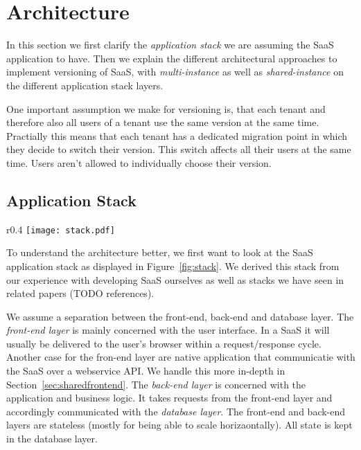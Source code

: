 \section{Architecture}
\label{sec:architecture}

In this section we first clarify the \emph{application stack} we are assuming the SaaS application to have. Then we explain the different architectural approaches to implement versioning of SaaS, with \emph{multi-instance} as well as \emph{shared-instance} on the different application stack layers.

One important assumption we make for versioning is, that each tenant and therefore also all users of a tenant use the same version at the same time. Practially this means that each tenant has a dedicated migration point in which they decide to switch their version. This switch affects all their users at the same time. Users aren't allowed to individually choose their version.

\subsection{Application Stack}

\begin{wrapfigure}{r}{0.4\textwidth}
\centering
\texttt{[image: stack.pdf]}
\caption{Simplified Application Stack}
\label{fig:stack}
\end{wrapfigure}

To understand the architecture better, we first want to look at the SaaS application stack as displayed in Figure~\ref{fig:stack}. We derived this stack from our experience with developing SaaS ourselves as well as stacks we have seen in related papers (TODO references).

We assume a separation between the front-end, back-end and database layer. The \emph{front-end layer} is mainly concerned with the user interface. In a SaaS it will usually be delivered to the user's browser within a request/response cycle. Another case for the fron-end layer are native application that communicatie with the SaaS over a webservice API. We handle this more in-depth in Section~\ref{sec:sharedfrontend}. The \emph{back-end layer} is concerned with the application and business logic. It takes requests from the front-end layer and accordingly communicated with the \emph{database layer}. The front-end and back-end layers are stateless (mostly for being able to scale horizaontally). All state is kept in the database layer.

